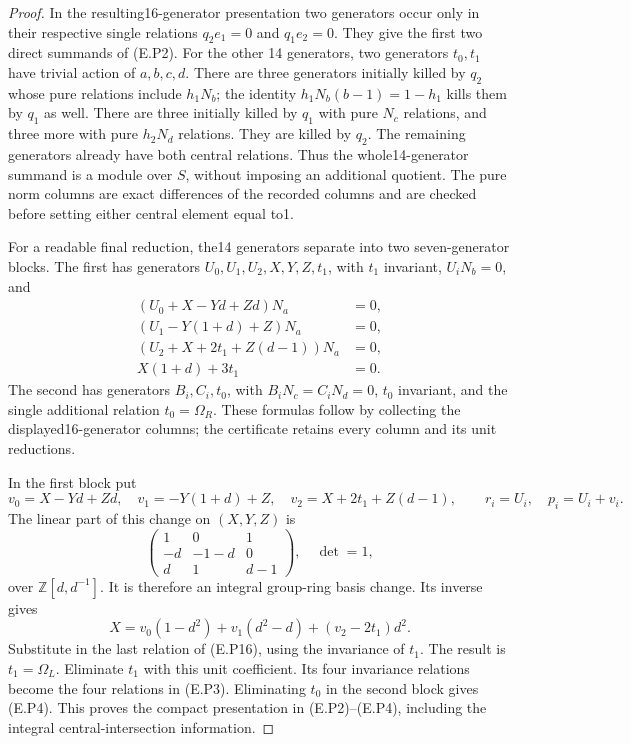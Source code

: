\begin{proof}
In the resulting16-generator presentation two
generators occur only in their respective single
relations $q_2e_1=0$ and $q_1e_2=0$. They give the
first two direct summands of (E.P2). For the other
14 generators, two generators $t_0,t_1$ have
trivial action of $a,b,c,d$. There are three
generators initially killed by $q_2$ whose pure
relations include $h_1N_b$; the identity
$h_1N_b(b-1)=1-h_1$ kills them by $q_1$ as well.
There are three initially killed by $q_1$ with
pure $N_c$ relations, and three more with pure
$h_2N_d$ relations. They are killed by $q_2$.
The remaining generators already have both
central relations. Thus the whole14-generator
summand is a module over $S$, without imposing
an additional quotient. The pure norm columns
are exact differences of the recorded columns
and are checked before setting either central
element equal to1.

For a readable final reduction, the14 generators
separate into two seven-generator blocks. The
first has generators $U_0,U_1,U_2,X,Y,Z,t_1$,
with $t_1$ invariant, $U_iN_b=0$, and
\[
 \begin{split}
 (U_0+X-Yd+Zd)N_a&=0,\\
 (U_1-Y(1+d)+Z)N_a&=0,\\
 (U_2+X+2t_1+Z(d-1))N_a&=0,\\
 X(1+d)+3t_1&=0.
 \end{split}
 \tag{E.P16}
\]
The second has generators $B_i,C_i,t_0$, with
$B_iN_c=C_iN_d=0$, $t_0$ invariant, and the single
additional relation $t_0=\Omega_R$. These formulas
follow by collecting the displayed16-generator
columns; the certificate retains every column
and its unit reductions.

In the first block put
\[
 v_0=X-Yd+Zd,\quad v_1=-Y(1+d)+Z,
 \quad v_2=X+2t_1+Z(d-1),\qquad
 r_i=U_i,\quad p_i=U_i+v_i.
 \tag{E.P17}
\]
The linear part of this change on $(X,Y,Z)$ is
\[
 \begin{pmatrix}1&0&1\\-d&-1-d&0\\d&1&d-1\end{pmatrix},
 \quad\det=1,
\]
over $\mathbb Z[d,d^{-1}]$. It is therefore an
integral group-ring basis change. Its inverse gives
\[
 X=v_0(1-d^2)+v_1(d^2-d)+(v_2-2t_1)d^2.
\]
Substitute in the last relation of (E.P16), using
the invariance of $t_1$. The result is
$t_1=\Omega_L$. Eliminate $t_1$ with this unit
coefficient. Its four invariance relations become
the four relations in (E.P3). Eliminating $t_0$
in the second block gives (E.P4). This proves the
compact presentation in (E.P2)--(E.P4), including
the integral central-intersection information.


\end{proof}
